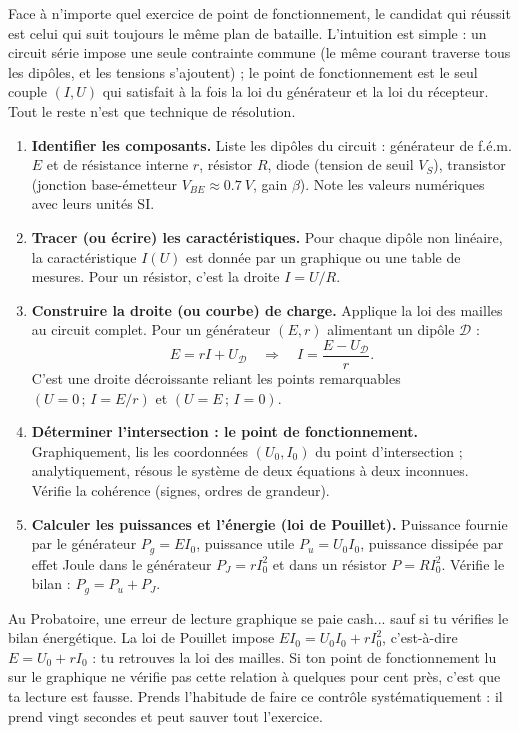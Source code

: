 \documentclass[11pt]{article}
\newcounter{popsec}
\newcounter{popsub}
\newcommand{\courssub}[1]{%
  \stepcounter{popsub}%
  \par\vspace{9pt}\noindent{\popxbold\fontsize{11.5}{13}\selectfont\color{popink}{\color{poporange}\thepopsec.\thepopsub}\hspace{6pt}#1}\par\nopagebreak\vspace{4pt}
}
\begin{document}
\courssub{La démarche complète en cinq étapes}

Face à n'importe quel exercice de point de fonctionnement, le candidat qui réussit est celui qui suit toujours le même plan de bataille. L'intuition est simple : un circuit série impose une seule contrainte commune (le même courant traverse tous les dipôles, et les tensions s'ajoutent) ; le point de fonctionnement est le seul couple $(I, U)$ qui satisfait à la fois la loi du générateur et la loi du récepteur. Tout le reste n'est que technique de résolution.

\begin{methode}
\begin{enumerate}
\item \textbf{Identifier les composants.} Liste les dipôles du circuit : générateur de f.é.m. $E$ et de résistance interne $r$, résistor $R$, diode (tension de seuil $V_S$), transistor (jonction base-émetteur $V_{BE} \approx \SI{0,7}{V}$, gain $\beta$). Note les valeurs numériques avec leurs unités SI.
\item \textbf{Tracer (ou écrire) les caractéristiques.} Pour chaque dipôle non linéaire, la caractéristique $I(U)$ est donnée par un graphique ou une table de mesures. Pour un résistor, c'est la droite $I = U/R$.
\item \textbf{Construire la droite (ou courbe) de charge.} Applique la loi des mailles au circuit complet. Pour un générateur $(E, r)$ alimentant un dipôle $\mathcal{D}$ :
\[ E = rI + U_{\mathcal{D}} \quad \Longrightarrow \quad I = \frac{E - U_{\mathcal{D}}}{r}. \]
C'est une droite décroissante reliant les points remarquables $(U=0\,;\,I = E/r)$ et $(U = E\,;\,I = 0)$.
\item \textbf{Déterminer l'intersection : le point de fonctionnement.} Graphiquement, lis les coordonnées $(U_0, I_0)$ du point d'intersection ; analytiquement, résous le système de deux équations à deux inconnues. Vérifie la cohérence (signes, ordres de grandeur).
\item \textbf{Calculer les puissances et l'énergie (loi de Pouillet).} Puissance fournie par le générateur $P_g = E I_0$, puissance utile $P_u = U_0 I_0$, puissance dissipée par effet Joule dans le générateur $P_J = r I_0^2$ et dans un résistor $P = R I_0^2$. Vérifie le bilan : $P_g = P_u + P_J$.
\end{enumerate}
\end{methode}

\begin{attention}
Au Probatoire, une erreur de lecture graphique se paie cash... sauf si tu vérifies le bilan énergétique. La loi de Pouillet impose $E I_0 = U_0 I_0 + r I_0^2$, c'est-à-dire $E = U_0 + r I_0$ : tu retrouves la loi des mailles. Si ton point de fonctionnement lu sur le graphique ne vérifie pas cette relation à quelques pour cent près, c'est que ta lecture est fausse. Prends l'habitude de faire ce contrôle systématiquement : il prend vingt secondes et peut sauver tout l'exercice.
\end{attention}
\end{document}
